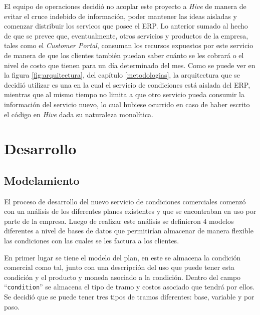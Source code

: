   El equipo de operaciones decidió no acoplar este proyecto a \textit{Hive} de manera de evitar el cruce indebido de información, poder mantener las ideas aisladas y comenzar distribuir los servicos que posee el ERP. Lo anterior sumado al hecho de que se prevee que, eventualmente, otros servicios y productos de la empresa, tales como el \textit{Customer Portal}, consuman los recursos expuestos por este servicio de manera de que los clientes también puedan saber cuánto se les cobrará o el nivel de costo que tienen para un día determinado del mes. Como se puede ver en la figura \ref{fig:arquitectura}, del capítulo \ref{metodologias}, la arquitectura que se decidió utilizar es una en la cual el servicio de condiciones está aislada del ERP, mientras que al mismo tiempo no limita a que otro servicio pueda consumir la información del servicio nuevo, lo cual hubiese ocurrido en caso de haber escrito el código en \textit{Hive} dada su naturaleza monolítica.

\section{Desarrollo}

  \subsection{Modelamiento}
    \label{modelamiento}

    El proceso de desarrollo del nuevo servicio de condiciones comerciales comenzó con un análisis de los diferentes planes existentes y que se encontraban en uso por parte de la empresa. Luego de realizar este análisis se definieron 4 modelos diferentes a nivel de bases de datos que permitirían almacenar de manera flexible las condiciones con las cuales se les factura a los clientes. 
    
    En primer lugar se tiene el modelo del plan, en este se almacena la condición comercial como tal, junto con una descripción del uso que puede tener esta condición y el producto y moneda asociado a la condición. Dentro del campo ``\texttt{condition}'' se almacena el tipo de tramo y costos asociado que tendrá por ellos. Se decidió que se puede tener tres tipos de tramos diferentes: base, variable y por paso.
    
